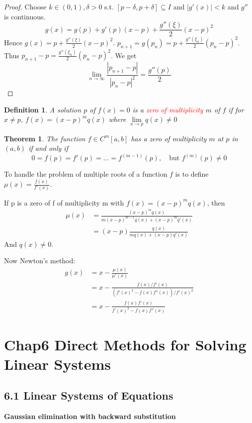 \documentclass[11pt]{article}
\newtheorem{theorem}{Theorem}[section]
\newtheorem{definition}{Definition}[section]
\begin{document}
\begin{proof}
Choose $k\in(0,1),\delta>0$ s.t. $[p-\delta,p+\delta]\subseteq I$ and
$|g'(x)|<k$ and $g''$ is continuous.
\begin{equation*}
g(x)=g(p)+g'(p)(x-p)+\frac{g''(\xi)}{2}(x-p)^2
\end{equation*}
Hence $g(x)=p+\frac{g''(\xi)}{2}(x-p)^2$.
$p_{n+1}=g(p_n)=p+\frac{g''(\xi_n)}{2}(p_n-p)^2$. Thus
$p_{n+1}-p=\frac{g''(\xi_n)}{2}(p_n-p)^2$. We get
\begin{equation*}
\lim\limits_{n\to\infty}\frac{|p_{n+1}-p|}{|p_n-p|^2}=\frac{g''(p)}{2}
\end{equation*}
\end{proof}

\begin{definition}
A solution $p$ of $f(x) = 0$ is a \textcolor{red}{zero of multiplicity} $m$
of $f$ if for $x\neq p$, $f(x)=(x-p)^mq(x)$ where $\lim\limits_{x\to
p}q(x)\neq 0$
\end{definition}

\begin{theorem}
The function $f\in C^m[a,b]$ has a zero of multiplicity $m$ at $p$ in $(a,b)$
if and only if
\begin{equation*}
0=f(p)=f'(p)=\dots=f^{(m-1)}(p),\quad\text{but } f^{(m)}(p)\neq 0
\end{equation*}
\end{theorem}

To handle the problem of multiple roots of a function \(f\) is to define
\(\mu(x)=\frac{f(x)}{f'(x)}\).

If p is a zero of f of multiplicity m with \(f(x)=(x-p)^mq(x
)\), then
\begin{align*}
\mu(x)&=\frac{(x-p)^mq(x)}{m(x-p)^{m-1}q(x)+(x-p)^mq'(x)}\\
&=(x-p)\frac{q(x)}{mq(x)+(x-p)q'(x)}
\end{align*}
And \(q(x)\neq 0\).

Now Newton's method:
\begin{align*}
g(x)&=x-\frac{\mu(x)}{\mu'(x)}\\
&=x-\frac{f(x)/f'(x)}{(f'(x)^2-f(x)f''(x))/f'(x)^2}\\
&=x-\frac{f(x)f'(x)}{f'(x)^2-f(x)f''(x)}
\end{align*}
\section{Chap6 Direct Methods for Solving Linear Systems}
\label{sec:orge54b9da}
\subsection{6.1 Linear Systems of Equations}
\label{sec:orgfb9d6c4}
\textbf{Gaussian elimination with backward substitution}
\end{document}
